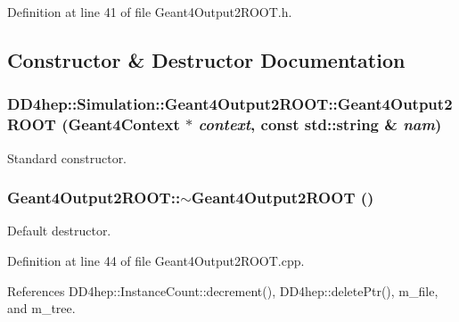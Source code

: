 Definition at line 41 of file Geant4Output2ROOT.h.

\subsection{Constructor \& Destructor Documentation}
\hypertarget{class_d_d4hep_1_1_simulation_1_1_geant4_output2_r_o_o_t_ab53b90ff941ab7e6fde9e410c346b2a1}{
\subsubsection[{Geant4Output2ROOT}]{\setlength{\rightskip}{0pt plus 5cm}DD4hep::Simulation::Geant4Output2ROOT::Geant4Output2ROOT ({\bf Geant4Context} $\ast$ {\em context}, \/  const std::string \& {\em nam})}}
\label{class_d_d4hep_1_1_simulation_1_1_geant4_output2_r_o_o_t_ab53b90ff941ab7e6fde9e410c346b2a1}


Standard constructor. \hypertarget{class_d_d4hep_1_1_simulation_1_1_geant4_output2_r_o_o_t_a572289de75b5e3a65cb3bda92139cba2}{
\subsubsection[{$\sim$Geant4Output2ROOT}]{\setlength{\rightskip}{0pt plus 5cm}Geant4Output2ROOT::$\sim$Geant4Output2ROOT ()}}
\label{class_d_d4hep_1_1_simulation_1_1_geant4_output2_r_o_o_t_a572289de75b5e3a65cb3bda92139cba2}


Default destructor. 

Definition at line 44 of file Geant4Output2ROOT.cpp.

References DD4hep::InstanceCount::decrement(), DD4hep::deletePtr(), m\_\-file, and m\_\-tree.

